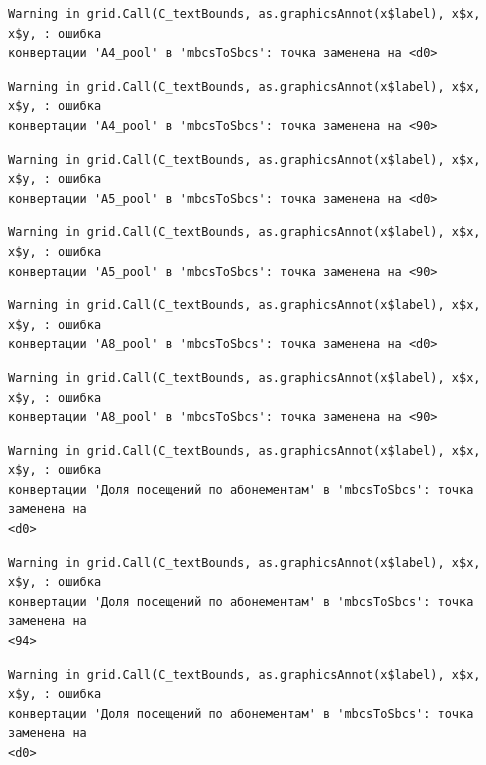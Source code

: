 \documentclass[
  letterpaper,
  DIV=11,
  numbers=noendperiod]{scrreprt}
\begin{document}
\begin{verbatim}
Warning in grid.Call(C_textBounds, as.graphicsAnnot(x$label), x$x, x$y, : ошибка
конвертации 'А4_pool' в 'mbcsToSbcs': точка заменена на <d0>
\end{verbatim}

\begin{verbatim}
Warning in grid.Call(C_textBounds, as.graphicsAnnot(x$label), x$x, x$y, : ошибка
конвертации 'А4_pool' в 'mbcsToSbcs': точка заменена на <90>
\end{verbatim}

\begin{verbatim}
Warning in grid.Call(C_textBounds, as.graphicsAnnot(x$label), x$x, x$y, : ошибка
конвертации 'А5_pool' в 'mbcsToSbcs': точка заменена на <d0>
\end{verbatim}

\begin{verbatim}
Warning in grid.Call(C_textBounds, as.graphicsAnnot(x$label), x$x, x$y, : ошибка
конвертации 'А5_pool' в 'mbcsToSbcs': точка заменена на <90>
\end{verbatim}

\begin{verbatim}
Warning in grid.Call(C_textBounds, as.graphicsAnnot(x$label), x$x, x$y, : ошибка
конвертации 'А8_pool' в 'mbcsToSbcs': точка заменена на <d0>
\end{verbatim}

\begin{verbatim}
Warning in grid.Call(C_textBounds, as.graphicsAnnot(x$label), x$x, x$y, : ошибка
конвертации 'А8_pool' в 'mbcsToSbcs': точка заменена на <90>
\end{verbatim}

\begin{verbatim}
Warning in grid.Call(C_textBounds, as.graphicsAnnot(x$label), x$x, x$y, : ошибка
конвертации 'Доля посещений по абонементам' в 'mbcsToSbcs': точка заменена на
<d0>
\end{verbatim}

\begin{verbatim}
Warning in grid.Call(C_textBounds, as.graphicsAnnot(x$label), x$x, x$y, : ошибка
конвертации 'Доля посещений по абонементам' в 'mbcsToSbcs': точка заменена на
<94>
\end{verbatim}

\begin{verbatim}
Warning in grid.Call(C_textBounds, as.graphicsAnnot(x$label), x$x, x$y, : ошибка
конвертации 'Доля посещений по абонементам' в 'mbcsToSbcs': точка заменена на
<d0>
\end{verbatim}
\end{document}
